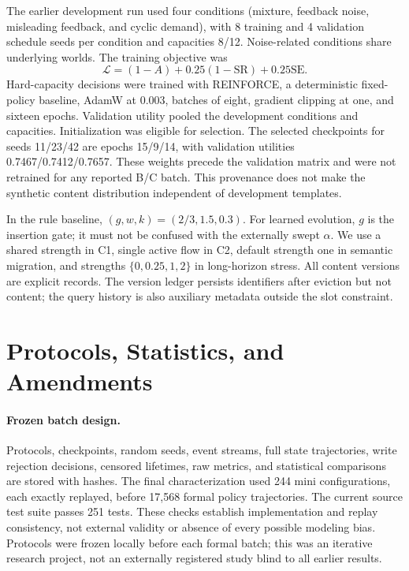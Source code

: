 The earlier development run used four conditions (mixture, feedback noise, misleading feedback, and cyclic demand), with 8 training and 4 validation schedule seeds per condition and capacities 8/12. Noise-related conditions share underlying worlds. The training objective was
\begin{equation}
\mathcal L=(1-A)+0.25(1-\mathrm{SR})+0.25\mathrm{SE}.
\end{equation}
Hard-capacity decisions were trained with REINFORCE, a deterministic fixed-policy baseline, AdamW at 0.003, batches of eight, gradient clipping at one, and sixteen epochs. Validation utility pooled the development conditions and capacities. Initialization was eligible for selection. The selected checkpoints for seeds 11/23/42 are epochs 15/9/14, with validation utilities 0.7467/0.7412/0.7657. These weights precede the validation matrix and were not retrained for any reported B/C batch. This provenance does not make the synthetic content distribution independent of development templates.

In the rule baseline, $(g,w,k)=(2/3,1.5,0.3)$. For learned evolution, $g$ is the insertion gate; it must not be confused with the externally swept $\alpha$. We use a shared strength in C1, single active flow in C2, default strength one in semantic migration, and strengths $\{0,0.25,1,2\}$ in long-horizon stress. All content versions are explicit records. The version ledger persists identifiers after eviction but not content; the query history is also auxiliary metadata outside the slot constraint.

\section{Protocols, Statistics, and Amendments}\label{app:protocol}
\paragraph{Frozen batch design.}
Protocols, checkpoints, random seeds, event streams, full state trajectories, write rejection decisions, censored lifetimes, raw metrics, and statistical comparisons are stored with hashes. The final characterization used 244 mini configurations, each exactly replayed, before 17,568 formal policy trajectories. The current source test suite passes 251 tests. These checks establish implementation and replay consistency, not external validity or absence of every possible modeling bias. Protocols were frozen locally before each formal batch; this was an iterative research project, not an externally registered study blind to all earlier results.

